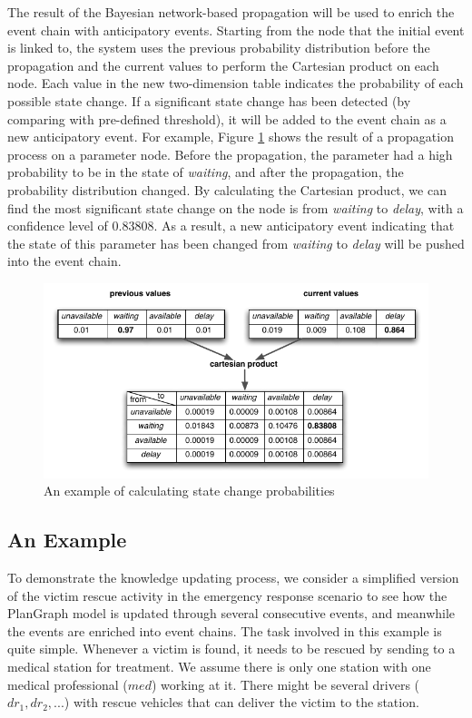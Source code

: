 The result of the Bayesian network-based propagation will be used to enrich the event chain with anticipatory events. Starting from the node that the initial event is linked to, the system uses the previous probability distribution before the propagation and the current values to perform the Cartesian product on each node. Each value in the new two-dimension table indicates the probability of each possible state change. If a significant state change has been detected (by comparing with pre-defined threshold), it will be added to the event chain as a new anticipatory event. For example, Figure \ref{fig:prob_state_change} shows the result of a propagation process on a parameter node. Before the propagation, the parameter had a high probability to be in the state of \emph{waiting}, and after the propagation, the probability distribution changed. By calculating the Cartesian product, we can find the most significant state change on the node is from \emph{waiting} to \emph{delay}, with a confidence level of $0.83808$. As a result, a new anticipatory event indicating that the state of this parameter has been changed from \emph{waiting} to \emph{delay} will be pushed into the event chain.
\begin{figure}[htbp] %
	\centering
	\includegraphics{prob_state_change.pdf} 
	\caption{An example of calculating state change probabilities}
	\label{fig:prob_state_change}
\end{figure}
\subsection{An Example} %
\label{sub:an_example}
To demonstrate the knowledge updating process, we consider a simplified version of the victim rescue activity in the emergency response scenario to see how the PlanGraph model is updated through several consecutive events, and meanwhile the events are enriched into event chains. The task involved in this example is quite simple. Whenever a victim is found, it needs to be rescued by sending to a medical station for treatment. We assume there is only one station with one medical professional ($med$) working at it. There might be several drivers ($dr_1, dr_2, ...$) with rescue vehicles that can deliver the victim to the station.   

